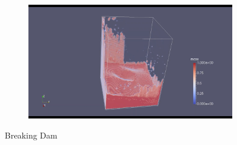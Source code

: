 \documentclass[10pt,a4paper,notitlepage]{article}
\begin{document}
\begin{figure}[H]
\begin{subfigure}{0.25\textwidth}
\end{subfigure}
\begin{subfigure}{0.25\textwidth}
  \includegraphics[width=1.0\linewidth]{dam/9.png}
\end{subfigure}
\caption{Breaking Dam}
\label{fig:dam}
\end{figure}
\end{document}
